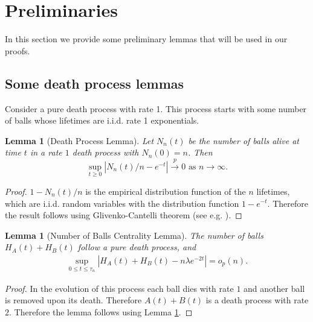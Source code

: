 \documentclass[11pt]{article}
\newtheorem{lemma}[theorem]{Lemma}
\def\top{\stackrel{p}{\longrightarrow}}
\def\top{\stackrel{p}{\longrightarrow}}
\begin{document}
\section{Preliminaries}

In this section we provide some preliminary lemmas that will be used in our proofs. 

\subsection{Some death process lemmas}
Consider a pure death process with rate 1. This process starts with some number of balls whose lifetimes are i.i.d. rate 1 exponentials. 
\begin{lemma}[Death Process Lemma] \label{lem_n-death}
Let $N_n(t)$ be the number of balls alive at time $t$ in a rate $1$ death process with $N_n(0)=n$. Then
\[
\sup_{t\geq 0}|N_n(t)/n - e^{-t}| \top 0 \text{  as  }n\rightarrow \infty. 
\]
\end{lemma}
\begin{proof}
 $1-N_n(t)/n$ is the empirical distribution function of the $n$ lifetimes, which are i.i.d. random variables with the distribution function $1-e^{-t}$. Therefore the result follows using Glivenko-Cantelli theorem (see e.g. \cite[Proposition 4.24]{kallenberg1997foundations}).
\end{proof}
\begin{lemma}[Number of Balls Centrality Lemma]
The number of balls $H_A(t)+H_B(t)$ follow a pure death process, and  
\begin{align*}
\sup_{0\leq t\leq \tau_n}|H_A(t)+H_B(t)-n\lambda e^{-2t}| = o_p(n).
\end{align*}
\end{lemma}
\begin{proof} In the evolution of this process each ball dies with rate $1$ and another ball is removed upon its death. Therefore $A(t)+B(t)$ is a death process with rate $2$. Therefore the lemma follows using Lemma \ref{lem_n-death}.
\end{proof} 
\end{document}

